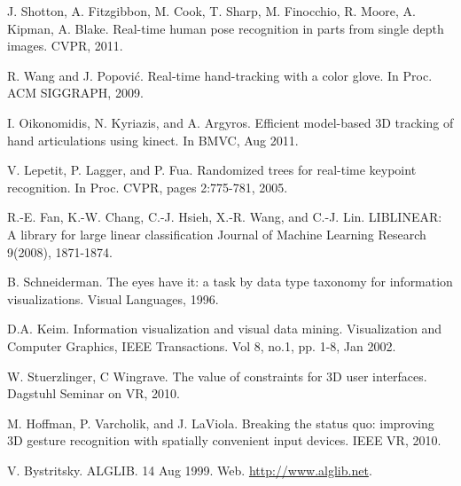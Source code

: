 \documentclass[letterpaper,twocolumn,10pt]{article}
\begin{document}

\begin{thebibliography}{9}

 J. Shotton, A. Fitzgibbon, M. Cook, T. Sharp, M. Finocchio, R. Moore, A. Kipman, A. Blake. Real-time human pose recognition in parts from single depth images. CVPR, 2011.

 R. Wang and J. Popovi\'c. Real-time hand-tracking with a color glove. In Proc. ACM SIGGRAPH, 2009.

 I. Oikonomidis, N. Kyriazis, and A. Argyros. Efficient model-based 3D tracking of hand articulations using kinect. In BMVC, Aug 2011.

 V. Lepetit, P. Lagger, and P. Fua. Randomized trees for real-time keypoint recognition. In Proc. CVPR, pages 2:775-781, 2005. 

 R.-E. Fan, K.-W. Chang, C.-J. Hsieh, X.-R. Wang, and C.-J. Lin. LIBLINEAR: A library for large linear classification Journal of Machine Learning Research 9(2008), 1871-1874.

 B. Schneiderman. The eyes have it: a task by data type taxonomy for information visualizations. Visual Languages, 1996.

 D.A. Keim. Information visualization and visual data mining. Visualization and Computer Graphics, IEEE Transactions. Vol 8, no.1, pp. 1-8, Jan 2002.

 W. Stuerzlinger, C Wingrave. The value of constraints for 3D user interfaces. Dagstuhl Seminar on VR, 2010.

 M. Hoffman, P. Varcholik, and J. LaViola. Breaking the status quo: improving 3D gesture recognition with spatially convenient input devices. IEEE VR, 2010.

 V. Bystritsky. ALGLIB. 14 Aug 1999. Web. \url{http://www.alglib.net}.

\end{thebibliography}
\end{document}

